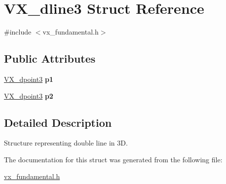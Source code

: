 \hypertarget{structVX__dline3}{\section{V\-X\-\_\-dline3 Struct Reference}
\label{structVX__dline3}
}


{\ttfamily \#include $<$vx\-\_\-fundamental.\-h$>$}

\subsection*{Public Attributes}
\begin{DoxyCompactItemize}
\item 
\hypertarget{structVX__dline3_aedc8c8de14ca7a7300ddc8337e291689}{\hyperlink{structVX__dpoint3}{V\-X\-\_\-dpoint3} {\bfseries p1}}\label{structVX__dline3_aedc8c8de14ca7a7300ddc8337e291689}

\item 
\hypertarget{structVX__dline3_a3647107183f647c85cb3de1b56a96b13}{\hyperlink{structVX__dpoint3}{V\-X\-\_\-dpoint3} {\bfseries p2}}\label{structVX__dline3_a3647107183f647c85cb3de1b56a96b13}

\end{DoxyCompactItemize}


\subsection{Detailed Description}
Structure representing double line in 3\-D. 

The documentation for this struct was generated from the following file\-:\begin{DoxyCompactItemize}
\item 
\hyperlink{vx__fundamental_8h}{vx\-\_\-fundamental.\-h}\end{DoxyCompactItemize}
